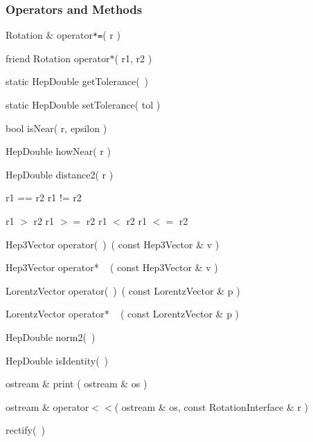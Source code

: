 \subsubsection{Operators and Methods}

\begin{shortlist}
  \item Rotation \& operator\verb$*=$( r )
  \item friend Rotation operator$*$( r1, r2 )
\end{shortlist}

\begin{shortlist}
  \item static HepDouble getTolerance(~)	\see{\ref{eq:epsildefR}}
  \item static HepDouble setTolerance( tol )
  \item bool isNear( r, epsilon )		\see{\ref{eq:nearrot}}
  \item HepDouble howNear( r ) 			\see{\ref{eq:nearrot}}
  \item HepDouble distance2( r )		\see{\ref{eq:dist2rot}}
\end{shortlist}

\begin{shortlist}
  \item r1 == r2 \/\/\/ r1 != r2
  \item r1 $>$ r2 \/\/\/ r1 $>=$ r2 \/\/\/ r1 $<$ r2 \/\/\/ r1 $<=$ r2 
		\see{\ref{eq:ordrot}}
\end{shortlist}

\begin{shortlist}
  \item Hep3Vector operator(~)~( const Hep3Vector \& v ) \see{\ref{eq:Rv}}
  \item Hep3Vector operator* ~ ( const Hep3Vector \& v ) \see{\ref{eq:Rv}}
  \item LorentzVector operator(~)~( const LorentzVector \& p ) \see{\ref{eq:Rv}}
  \item LorentzVector operator* ~ ( const LorentzVector \& p ) \see{\ref{eq:Rv}}
\end{shortlist}


\begin{shortlist}
  \item HepDouble norm2(~)		\see{\ref{eq:norm2rot}}
  \item HepDouble isIdentity(~)		

  \item ostream \& print ( ostream \& os )
  \item ostream \& operator$<<$( ostream \& os, const RotationInterface \& r )
  \item rectify(~)				\see{\ref{eq:rectRot}}

\end{shortlist}

